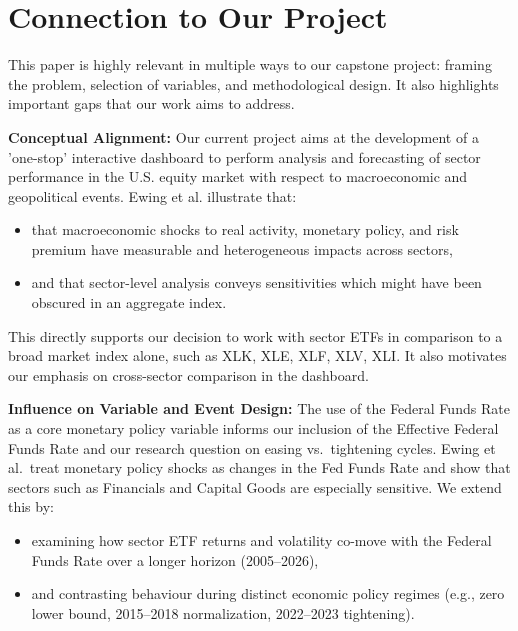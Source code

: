 \documentclass{article}
\begin{document}
\section{Connection to Our Project}

\noindent This paper is highly relevant in multiple ways to our capstone project: framing the problem, selection of variables, and methodological design. It also highlights important gaps that our work aims to address.

\vspace{0.5em}

\noindent \textbf{Conceptual Alignment:}  
Our current project aims at the development of a 'one-stop' interactive dashboard to perform analysis and forecasting of sector performance in the U.S. equity market with respect to macroeconomic and geopolitical events. Ewing et al. illustrate that:

\begin{itemize}
    \item that macroeconomic shocks to real activity, monetary policy, and risk premium have measurable and heterogeneous impacts across sectors,
    \item and that sector-level analysis conveys sensitivities which might have been obscured in an aggregate index. 
\end{itemize}

\noindent This directly supports our decision to work with sector ETFs in comparison to a broad market index alone, such as XLK, XLE, XLF, XLV, XLI. It also motivates our emphasis on cross-sector comparison in the dashboard.

\vspace{0.5em}

\noindent \textbf{Influence on Variable and Event Design:}  
The use of the Federal Funds Rate as a core monetary policy variable informs our inclusion of the Effective Federal Funds Rate and our research question on easing vs.\ tightening cycles. Ewing et al.\ treat monetary policy shocks as changes in the Fed Funds Rate and show that sectors such as Financials and Capital Goods are especially sensitive. We extend this by:

\begin{itemize}
    \item examining how sector ETF returns and volatility co-move with the Federal Funds Rate over a longer horizon (2005–2026),
    \item and contrasting behaviour during distinct economic policy regimes (e.g., zero lower bound, 2015–2018 normalization, 2022–2023 tightening).
\end{itemize}
\end{document}
